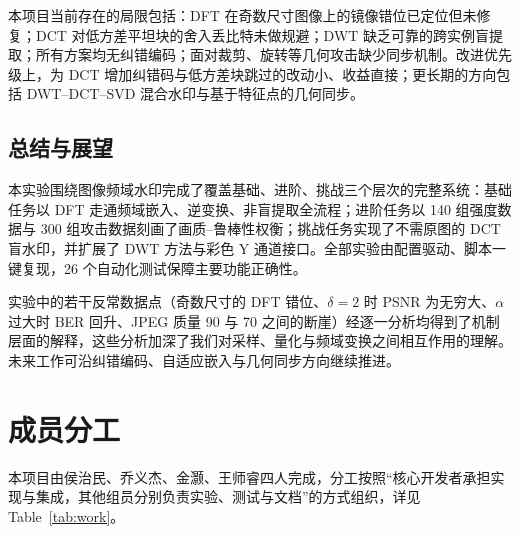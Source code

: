 \documentclass[11pt]{ctexart}
\begin{document}
本项目当前存在的局限包括：DFT 在奇数尺寸图像上的镜像错位已定位但未修复；DCT 对低方差平坦块的舍入丢比特未做规避；DWT 缺乏可靠的跨实例盲提取；所有方案均无纠错编码；面对裁剪、旋转等几何攻击缺少同步机制。改进优先级上，为 DCT 增加纠错码与低方差块跳过的改动小、收益直接；更长期的方向包括 DWT--DCT--SVD 混合水印与基于特征点的几何同步。

\subsection{总结与展望}

本实验围绕图像频域水印完成了覆盖基础、进阶、挑战三个层次的完整系统：基础任务以 DFT 走通频域嵌入、逆变换、非盲提取全流程；进阶任务以 140 组强度数据与 300 组攻击数据刻画了画质--鲁棒性权衡；挑战任务实现了不需原图的 DCT 盲水印，并扩展了 DWT 方法与彩色 Y 通道接口。全部实验由配置驱动、脚本一键复现，26 个自动化测试保障主要功能正确性。

实验中的若干反常数据点（奇数尺寸的 DFT 错位、$\delta=2$ 时 PSNR 为无穷大、$\alpha$ 过大时 BER 回升、JPEG 质量 90 与 70 之间的断崖）经逐一分析均得到了机制层面的解释，这些分析加深了我们对采样、量化与频域变换之间相互作用的理解。未来工作可沿纠错编码、自适应嵌入与几何同步方向继续推进。

\section{成员分工}

本项目由侯治民、乔义杰、金灏、王师睿四人完成，分工按照“核心开发者承担实现与集成，其他组员分别负责实验、测试与文档”的方式组织，详见 Table~\ref{tab:work}。
\end{document}
